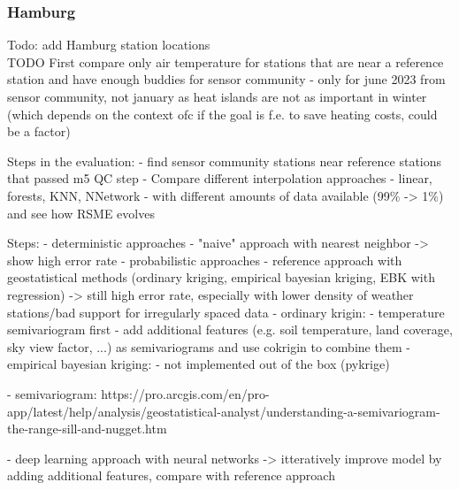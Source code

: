 \subsubsection{Hamburg}

Todo: add Hamburg station locations\\

TODO
First compare only air temperature for stations that are near a reference station and have enough buddies for sensor community
- only for june 2023 from sensor community, not january as heat islands are not as important in winter (which depends on the context ofc if the goal is f.e. to save heating costs, could be a factor)

Steps in the evaluation:
- find sensor community stations near reference stations that passed m5 QC step
- Compare different interpolation approaches
  - linear, forests, KNN, NNetwork
  - with different amounts of data available (99\% -> 1\%) and see how RSME evolves


Steps:
- deterministic approaches
  - "naive" approach with nearest neighbor -> show high error rate
- probabilistic approaches
  - reference approach with geostatistical methods (ordinary kriging, empirical bayesian kriging, EBK with regression) -> still high error rate, especially with lower density of weather stations/bad support for irregularly spaced data
    - ordinary krigin:
        - temperature semivariogram first
        - add additional features (e.g. soil temperature, land coverage, sky view factor, ...) as semivariograms and use cokrigin to combine them
    - empirical bayesian kriging:
        - not implemented out of the box (pykrige)

  - semivariogram: https://pro.arcgis.com/en/pro-app/latest/help/analysis/geostatistical-analyst/understanding-a-semivariogram-the-range-sill-and-nugget.htm

- deep learning approach with neural networks -> itteratively improve model by adding additional features, compare with reference approach


